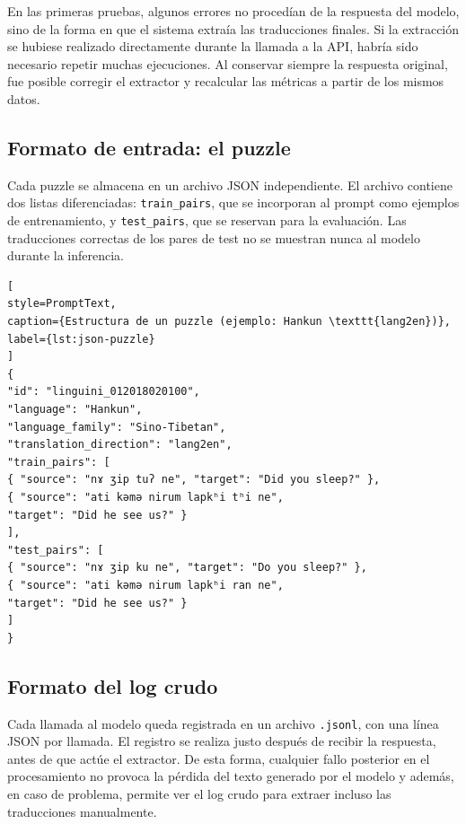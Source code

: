 En las primeras pruebas, algunos errores no procedían de la respuesta del modelo, sino de la forma en que el sistema extraía las traducciones finales. Si la extracción se hubiese realizado directamente durante la llamada a la API, habría sido necesario repetir muchas ejecuciones. Al conservar siempre la respuesta original, fue posible corregir el extractor y recalcular las métricas a partir de los mismos datos.

\subsection{Formato de entrada: el puzzle}
\label{subsec:formato-entrada}

Cada puzzle se almacena en un archivo JSON independiente. El archivo contiene dos listas diferenciadas: \texttt{train\_pairs}, que se incorporan al prompt como ejemplos de entrenamiento, y \texttt{test\_pairs}, que se reservan para la evaluación. Las traducciones correctas de los pares de test no se muestran nunca al modelo durante la inferencia.

\begin{lstlisting}[
style=PromptText,
caption={Estructura de un puzzle (ejemplo: Hankun \texttt{lang2en})},
label={lst:json-puzzle}
]
{
"id": "linguini_012018020100",
"language": "Hankun",
"language_family": "Sino-Tibetan",
"translation_direction": "lang2en",
"train_pairs": [
{ "source": "nɤ ʒip tuʔ ne", "target": "Did you sleep?" },
{ "source": "ati kəmə nirum lapkʰi tʰi ne",
"target": "Did he see us?" }
],
"test_pairs": [
{ "source": "nɤ ʒip ku ne", "target": "Do you sleep?" },
{ "source": "ati kəmə nirum lapkʰi ran ne",
"target": "Did he see us?" }
]
}
\end{lstlisting}

\subsection{Formato del log crudo}
\label{subsec:formato-raw-log}

Cada llamada al modelo queda registrada en un archivo \texttt{.jsonl}, con una línea JSON por llamada. El registro se realiza justo después de recibir la respuesta, antes de que actúe el extractor. De esta forma, cualquier fallo posterior en el procesamiento no provoca la pérdida del texto generado por el modelo y además, en caso de problema, permite ver el log crudo para extraer incluso las traducciones manualmente.

